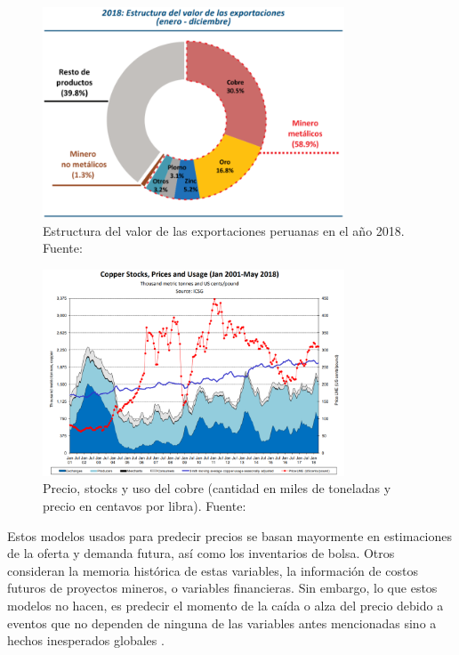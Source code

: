 \begin{figure}[h]
	\begin{center}
		\includegraphics[width=0.8\textwidth]{1/figures/estructura_exportaciones_peru.png}
		\caption{Estructura del valor de las exportaciones peruanas en el año 2018. Fuente: \cite{cu_ministerioPeru_statsminas}}
		\label{1:fig2}
	\end{center}
\end{figure}




\begin{figure}[h]
	\begin{center}
		\includegraphics[width=0.8\textwidth]{1/figures/copper_stocks_prices_usage.png}
		\caption{Precio, stocks y uso del cobre (cantidad en miles de toneladas y precio en centavos por libra). Fuente: \cite{cu_internationalcopper2018}}	
		\label{1:fig3}
	\end{center}
\end{figure}

Estos modelos usados para predecir precios se basan mayormente en estimaciones de la oferta y demanda futura, así como los inventarios de bolsa. Otros consideran la memoria histórica de estas variables, la información de costos futuros de proyectos mineros, o variables financieras. Sin embargo, lo que estos modelos no hacen, es predecir el momento de la caída o alza del precio debido a eventos que no dependen de ninguna de las variables antes mencionadas sino a hechos inesperados globales \citep{cu_lagos2017proyectar}. 


